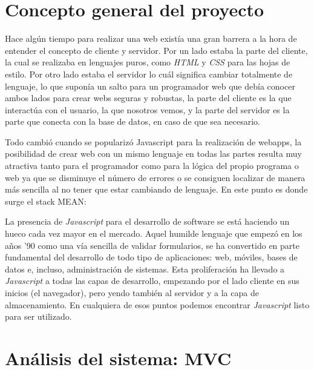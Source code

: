 \section{Concepto general del proyecto}\label{teorico-general}
Hace algún tiempo para realizar una web existía una gran barrera a la hora de entender el concepto de cliente y servidor. Por un lado estaba la parte del cliente, la cual se realizaba en lenguajes puros,  como \emph{HTML} y \emph{CSS} para las hojas de estilo. Por otro lado estaba el servidor lo cuál significa cambiar totalmente de lenguaje, lo que suponía un salto para un programador web que debía conocer ambos lados para crear webs seguras y robustas, la parte del cliente es la que interactúa con el usuario, la que nosotros vemos, y la parte del servidor es la parte que conecta con la base de datos, en caso de que sea necesario.

Todo cambió cuando se popularizó Javascript para la realización de webapps, la posibilidad de crear web con un mismo lenguaje en todas las partes resulta muy atractiva tanto para el programador como para la lógica del propio programa o web ya que se disminuye el número de errores o se consiguen localizar de manera más sencilla al no tener que estar cambiando de lenguaje. En este punto es donde surge el stack MEAN:




La presencia de \emph{Javascript} para el desarrollo de software se está haciendo un hueco cada vez mayor en el mercado. Aquel humilde lenguaje que empezó en los años '90 como una vía sencilla de validar formularios, se ha convertido en parte fundamental del desarrollo de todo tipo de aplicaciones: web, móviles, bases de datos e, incluso, administración de sistemas. Esta proliferación ha llevado a  \emph{Javascript} a todas las capas de desarrollo, empezando por el lado cliente en sus inicios (el navegador), pero yendo también al servidor y a la capa de almacenamiento. En cualquiera de esos puntos podemos encontrar  \emph{Javascript} listo para ser utilizado.







\section{Análisis del sistema: MVC}\label{analisis-sistema-mvc}

